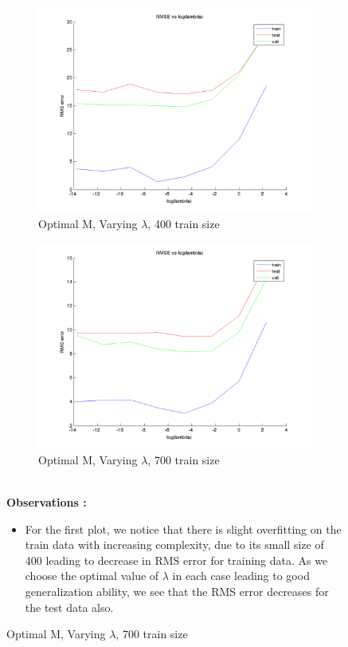 \documentclass{article}
\begin{document}
\begin{figure}[H]
\begin{subfigure}{.5\textwidth}
\centering
\includegraphics[width=\linewidth]{D2/RMS_lambda_400}
\caption{Optimal M, Varying $\lambda$, 400 train size}
\end{subfigure}
\begin{subfigure}{.5\textwidth}
\includegraphics[width=\linewidth]{D2/RMS_lambda_700}
\caption{Optimal M, Varying $\lambda$, 700 train size}
\end{subfigure}


\textbf{\\[20pt]Observations :}

\begin{itemize}
\item For the first plot, we notice that there is slight overfitting on the train data with increasing complexity, due to its small size of 400 leading to decrease in RMS error for training data. As we choose the optimal value of $\lambda$ in each case leading to good generalization ability, we see that the RMS error decreases for the test data also. 


\end{itemize}
\end{figure}
\end{document}
